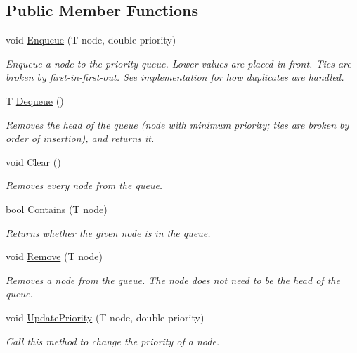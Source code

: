 \subsection*{Public Member Functions}
\begin{DoxyCompactItemize}
\item 
void \hyperlink{interface_priority___queue_1_1_i_priority_queue_ab9de1e02c2861409b9ee7ee2b0935840}{Enqueue} (T node, double priority)
\begin{DoxyCompactList}\small\item\em Enqueue a node to the priority queue. Lower values are placed in front. Ties are broken by first-\/in-\/first-\/out. See implementation for how duplicates are handled. \end{DoxyCompactList}\item 
T \hyperlink{interface_priority___queue_1_1_i_priority_queue_af5f9d687732841a773b3b0d332402b7b}{Dequeue} ()
\begin{DoxyCompactList}\small\item\em Removes the head of the queue (node with minimum priority; ties are broken by order of insertion), and returns it. \end{DoxyCompactList}\item 
void \hyperlink{interface_priority___queue_1_1_i_priority_queue_a5939e029c023e34d3f70c350f6355823}{Clear} ()
\begin{DoxyCompactList}\small\item\em Removes every node from the queue. \end{DoxyCompactList}\item 
bool \hyperlink{interface_priority___queue_1_1_i_priority_queue_ac7d7359b5f70bbed350d2fe3135519cf}{Contains} (T node)
\begin{DoxyCompactList}\small\item\em Returns whether the given node is in the queue. \end{DoxyCompactList}\item 
void \hyperlink{interface_priority___queue_1_1_i_priority_queue_a4140ec265c23d3b230d701a25def6cf9}{Remove} (T node)
\begin{DoxyCompactList}\small\item\em Removes a node from the queue. The node does not need to be the head of the queue. \end{DoxyCompactList}\item 
void \hyperlink{interface_priority___queue_1_1_i_priority_queue_a2f2576faa1974a2266d155addb431db2}{Update\+Priority} (T node, double priority)
\begin{DoxyCompactList}\small\item\em Call this method to change the priority of a node. \end{DoxyCompactList}\end{DoxyCompactItemize}
